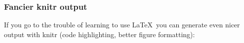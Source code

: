 \documentclass{beamer}
\begin{document}
\begin{frame}
  \frametitle{Fancier knitr output}

If you go to the trouble of learning to use \LaTeX\ you can generate even nicer output with knitr (code highlighting, better figure formatting):

\begin{center}
\end{center}


\end{frame}
\end{document}
